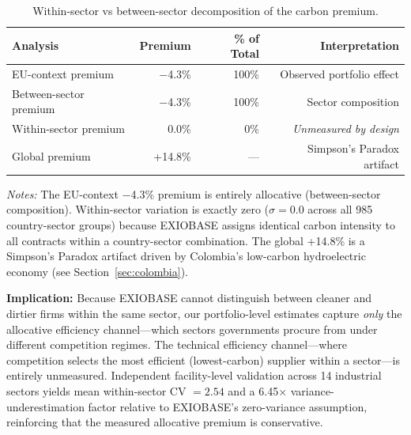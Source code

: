 \documentclass[11pt]{article}
\newcommand{\tabnoteblock}[1]{%
    \par\vspace{0.45em}%
    \begin{minipage}{0.98\linewidth}
    \footnotesize\raggedright #1
    \end{minipage}\par
}
\newcommand{\tabnotes}[1]{\tabnoteblock{\textit{Notes:} #1}}
\begin{document}
\begin{table}[H]
\centering
\caption{Within-sector vs between-sector decomposition of the carbon premium.}
\label{tab:decomposition}
\begin{tabular}{lrrr}
\toprule
\textbf{Analysis} & \textbf{Premium} & \textbf{\% of Total} & \textbf{Interpretation} \\
\midrule
EU-context premium & $-$4.3\% & 100\% & Observed portfolio effect \\
Between-sector premium & $-$4.3\% & 100\% & Sector composition \\
Within-sector premium & 0.0\% & 0\% & \textit{Unmeasured by design} \\
\midrule
Global premium & +14.8\% & --- & Simpson's Paradox artifact \\
\bottomrule
\end{tabular}

\tabnotes{The EU-context $-$4.3\% premium is entirely allocative (between-sector composition). Within-sector variation is exactly zero ($\sigma = 0.0$ across all 985 country-sector groups) because EXIOBASE assigns identical carbon intensity to all contracts within a country-sector combination. The global +14.8\% is a Simpson's Paradox artifact driven by Colombia's low-carbon hydroelectric economy (see Section~\ref{sec:colombia}).
}
\end{table}

\textbf{Implication:} Because EXIOBASE cannot distinguish between cleaner and dirtier firms within the same sector, our portfolio-level estimates capture \textit{only} the allocative efficiency channel---which sectors governments procure from under different competition regimes. The technical efficiency channel---where competition selects the most efficient (lowest-carbon) supplier within a sector---is entirely unmeasured. Independent facility-level validation across 14 industrial sectors yields mean within-sector CV $= 2.54$ and a 6.45$\times$ variance-underestimation factor relative to EXIOBASE's zero-variance assumption, reinforcing that the measured allocative premium is conservative.
\end{document}
